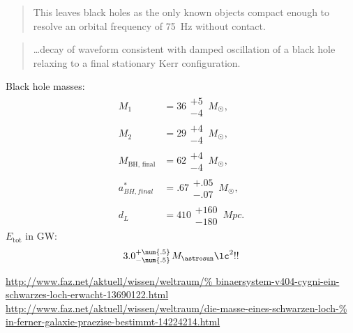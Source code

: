 \begin{quote}
This leaves black holes as the only known objects compact enough to resolve an 
orbital frequency of \SI{75}{\Hz} without contact.
\end{quote}
\begin{quote}
\dots decay of waveform consistent with damped oscillation of a black hole 
relaxing to a final stationary Kerr configuration.
\end{quote}

Black hole masses:
\begin{align}
M_1 &= 36\substack{+5 \\ -4}\,M_\astrosun,\\
M_2 &= 29\substack{+4 \\ -4}\,M_\astrosun,\\
M_\text{BH, final} &= 62\substack{+4 \\ -4}\,M_\astrosun,\\
a^*_{BH, final} &= \num{.67}\substack{+\num{.05} \\ -\num{.07}}\,M_\astrosun,\\
d_L &= \num{410}\substack{+\num{160} \\ -\num{180}}\,\si{Mpc}.
\end{align}
$E_\text{tot}$ in GW:
\begin{equation}
3.0\substack{+\num{.5} \\ -\num{.5}}\,M_\astrosun \lc^2 !!
\end{equation}

\url{http://www.faz.net/aktuell/wissen/weltraum/%
binaersystem-v404-cygni-ein-schwarzes-loch-erwacht-13690122.html}
\url{http://www.faz.net/aktuell/wissen/weltraum/die-masse-eines-schwarzen-loch-%
in-ferner-galaxie-praezise-bestimmt-14224214.html}

